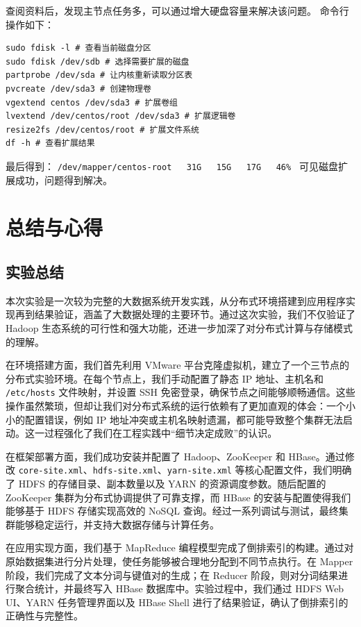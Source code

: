 \documentclass[]{bitreport}
\begin{document}
查阅资料后，发现主节点任务多，可以通过增大硬盘容量来解决该问题。
命令行操作如下：

\begin{lstlisting}[style=shell]
sudo fdisk -l # 查看当前磁盘分区
sudo fdisk /dev/sdb # 选择需要扩展的磁盘
partprobe /dev/sda # 让内核重新读取分区表
pvcreate /dev/sda3 # 创建物理卷
vgextend centos /dev/sda3 # 扩展卷组
lvextend /dev/centos/root /dev/sda3 # 扩展逻辑卷
resize2fs /dev/centos/root # 扩展文件系统
df -h # 查看扩展结果
\end{lstlisting}

最后得到：
\lstinline[style=shell]{/dev/mapper/centos-root   31G   15G   17G   46% }
可见磁盘扩展成功，问题得到解决。


\section{总结与心得}
\subsection{实验总结}

本次实验是一次较为完整的大数据系统开发实践，从分布式环境搭建到应用程序实现再到结果验证，涵盖了大数据处理的主要环节。通过这次实验，我们不仅验证了 Hadoop 生态系统的可行性和强大功能，还进一步加深了对分布式计算与存储模式的理解。

在环境搭建方面，我们首先利用 VMware 平台克隆虚拟机，建立了一个三节点的分布式实验环境。在每个节点上，我们手动配置了静态 IP 地址、主机名和 \texttt{/etc/hosts} 文件映射，并设置 SSH 免密登录，确保节点之间能够顺畅通信。这些操作虽然繁琐，但却让我们对分布式系统的运行依赖有了更加直观的体会：一个小小的配置错误，例如 IP 地址冲突或主机名映射遗漏，都可能导致整个集群无法启动。这一过程强化了我们在工程实践中“细节决定成败”的认识。

在框架部署方面，我们成功安装并配置了 Hadoop、ZooKeeper 和 HBase。通过修改 \texttt{core-site.xml}、\texttt{hdfs-site.xml}、\texttt{yarn-site.xml} 等核心配置文件，我们明确了 HDFS 的存储目录、副本数量以及 YARN 的资源调度参数。随后配置的 ZooKeeper 集群为分布式协调提供了可靠支撑，而 HBase 的安装与配置使得我们能够基于 HDFS 存储实现高效的 NoSQL 查询。经过一系列调试与测试，最终集群能够稳定运行，并支持大数据存储与计算任务。

在应用实现方面，我们基于 MapReduce 编程模型完成了倒排索引的构建。通过对原始数据集进行分片处理，使任务能够被合理地分配到不同节点执行。在 Mapper 阶段，我们完成了文本分词与键值对的生成；在 Reducer 阶段，则对分词结果进行聚合统计，并最终写入 HBase 数据库中。实验过程中，我们通过 HDFS Web UI、YARN 任务管理界面以及 HBase Shell 进行了结果验证，确认了倒排索引的正确性与完整性。
\end{document}
